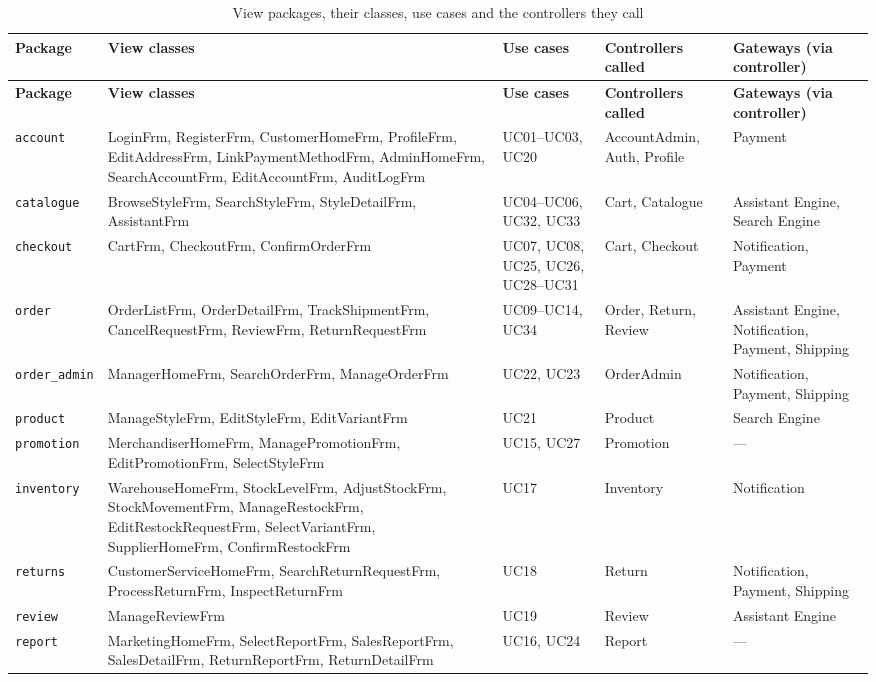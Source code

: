{\small
\begin{xltabular}{\textwidth}{@{}L{2.0cm} L{4.2cm} L{2.3cm} Y L{1.9cm}@{}}
\caption{View packages, their classes, use cases and the controllers they call}\label{tab:viewpackages}\\
\toprule
\textbf{Package} & \textbf{View classes} & \textbf{Use cases} & \textbf{Controllers called} & \textbf{Gateways (via controller)} \\ \midrule
\endfirsthead
\toprule
\textbf{Package} & \textbf{View classes} & \textbf{Use cases} & \textbf{Controllers called} & \textbf{Gateways (via controller)} \\ \midrule
\endhead
\bottomrule
\endlastfoot
\texttt{account} & LoginFrm, RegisterFrm, CustomerHomeFrm, ProfileFrm, EditAddressFrm, LinkPaymentMethodFrm, AdminHomeFrm, SearchAccountFrm, EditAccountFrm, AuditLogFrm & UC01--UC03, UC20 & AccountAdmin, Auth, Profile & Payment \\
\texttt{catalogue} & BrowseStyleFrm, SearchStyleFrm, StyleDetailFrm, AssistantFrm & UC04--UC06, UC32, UC33 & Cart, Catalogue & Assistant Engine, Search Engine \\
\texttt{checkout} & CartFrm, CheckoutFrm, ConfirmOrderFrm & UC07, UC08, UC25, UC26, UC28--UC31 & Cart, Checkout & Notification, Payment \\
\texttt{order} & OrderListFrm, OrderDetailFrm, TrackShipmentFrm, CancelRequestFrm, ReviewFrm, ReturnRequestFrm & UC09--UC14, UC34 & Order, Return, Review & Assistant Engine, Notification, Payment, Shipping \\
\texttt{order\_admin} & ManagerHomeFrm, SearchOrderFrm, ManageOrderFrm & UC22, UC23 & OrderAdmin & Notification, Payment, Shipping \\
\texttt{product} & ManageStyleFrm, EditStyleFrm, EditVariantFrm & UC21 & Product & Search Engine \\
\texttt{promotion} & MerchandiserHomeFrm, ManagePromotionFrm, EditPromotionFrm, SelectStyleFrm & UC15, UC27 & Promotion & --- \\
\texttt{inventory} & WarehouseHomeFrm, StockLevelFrm, AdjustStockFrm, StockMovementFrm, ManageRestockFrm, EditRestockRequestFrm, SelectVariantFrm, SupplierHomeFrm, ConfirmRestockFrm & UC17 & Inventory & Notification \\
\texttt{returns} & CustomerServiceHomeFrm, SearchReturnRequestFrm, ProcessReturnFrm, InspectReturnFrm & UC18 & Return & Notification, Payment, Shipping \\
\texttt{review} & ManageReviewFrm & UC19 & Review & Assistant Engine \\
\texttt{report} & MarketingHomeFrm, SelectReportFrm, SalesReportFrm, SalesDetailFrm, ReturnReportFrm, ReturnDetailFrm & UC16, UC24 & Report & --- \\
\end{xltabular}
}

